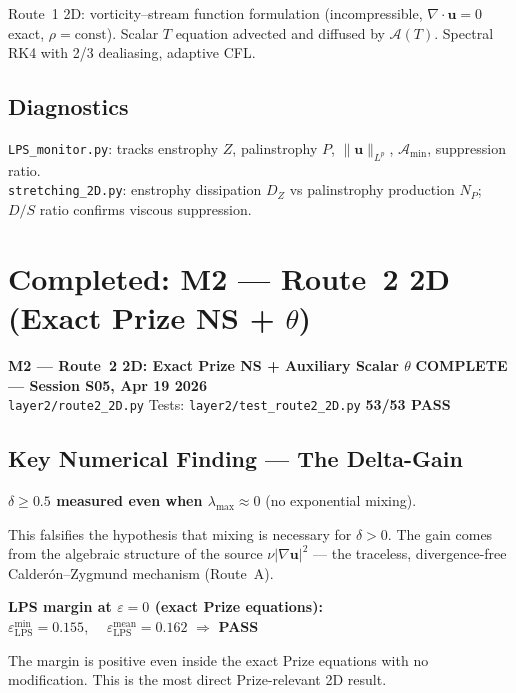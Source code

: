 \documentclass[11pt, a4paper]{article}
\theoremstyle{definition}
\theoremstyle{remark}
\newenvironment{keyresult}{%
  \begin{tcolorbox}[colback=tfgreen!6, colframe=tfgreen!60!black,
    title=\textbf{Key Result}, fonttitle=\small\bfseries,
    breakable, left=4pt, right=4pt, top=4pt, bottom=4pt]
}{%
  \end{tcolorbox}
}
\newenvironment{milestone}{%
  \begin{tcolorbox}[colback=tfblue!5, colframe=tfblue!50!black,
    breakable, left=4pt, right=4pt, top=4pt, bottom=4pt]
}{%
  \end{tcolorbox}
}
\newcommand{\Afield}{\mathcal{A}}
\newcommand{\eps}{\varepsilon}
\newcommand{\PASS}{\textcolor{passgreen}{\textbf{PASS}}}
\newcommand{\thet}{\theta}
\newcommand{\epslps}{\eps_{\mathrm{LPS}}}
\newcommand{\delt}{\delta}
\begin{document}
Route~1 2D: vorticity--stream function formulation (incompressible, $\nabla\cdot\mathbf{u}=0$
exact, $\rho=\mathrm{const}$). Scalar $T$ equation advected and diffused by $\Afield(T)$.
Spectral RK4 with 2/3 dealiasing, adaptive CFL.

\subsection{Diagnostics}

\texttt{LPS\_monitor.py}: tracks enstrophy $Z$, palinstrophy $P$, $\|\mathbf{u}\|_{L^p}$,
$\Afield_{\min}$, suppression ratio. \\
\texttt{stretching\_2D.py}: enstrophy dissipation $D_Z$ vs palinstrophy production $N_P$;
$D/S$ ratio confirms viscous suppression.

\section{Completed: M2 --- Route~2 2D (Exact Prize NS + $\thet$)}

\begin{milestone}
  \textbf{M2 --- Route~2 2D: Exact Prize NS + Auxiliary Scalar $\thet$}
  \hfill {\color{passgreen}\textbf{COMPLETE --- Session S05, Apr 19 2026}}\\[4pt]
  \texttt{layer2/route2\_2D.py} \quad Tests: \texttt{layer2/test\_route2\_2D.py}
  \quad \textbf{53/53 PASS}
\end{milestone}

\subsection{Key Numerical Finding --- The Delta-Gain}

\begin{keyresult}
\textbf{$\delt \geq 0.5$ measured even when $\lambda_{\max} \approx 0$} (no exponential mixing).

This falsifies the hypothesis that mixing is necessary for $\delt > 0$.
The gain comes from the algebraic structure of the source $\nu|\nabla\mathbf{u}|^2$ ---
the traceless, divergence-free Calder\'on--Zygmund mechanism (Route~A).

\medskip
\textbf{LPS margin at $\eps = 0$ (exact Prize equations):}\\
$\epslps^{\min} = 0.155$, $\quad \epslps^{\mathrm{mean}} = 0.162$ $\Rightarrow$ \PASS

The margin is positive even inside the exact Prize equations with no modification.
This is the most direct Prize-relevant 2D result.
\end{keyresult}
\end{document}
